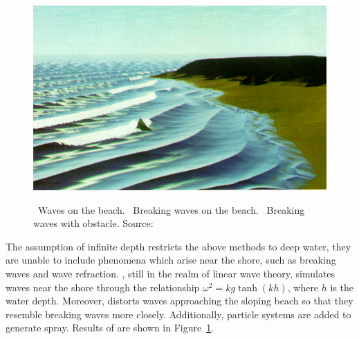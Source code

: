 \begin{figure}
{  \includegraphics[scale=0.125]{figures/Modeling_Waves_and_Surf_-_Peachey_1986-012.png}
	\label{fig:peachey1986:3}
 }
 \caption{~Waves on the beach.
~Breaking waves on the beach.
~Breaking waves with obstacle.
Source:~\cite{Peachey:1986}}
\label{fig:peachey1986}
\end{figure}
%
The assumption of infinite depth restricts the above methods to deep water, they
are unable to include phenomena which arise near the shore, such as breaking
waves and wave refraction. \cite{Peachey:1986}, still in the realm of linear
wave theory, simulates waves near the shore through the relationship
$\omega^2=kg\tanh (kh)$, where $h$ is the water depth. Moreover,
\citeauthor{Peachey:1986} distorts waves approaching the sloping beach so that
they resemble breaking waves more closely. Additionally, particle systems are
added to generate spray. Results of \cite{Peachey:1986} are shown in
Figure~\ref{fig:peachey1986}.
%
